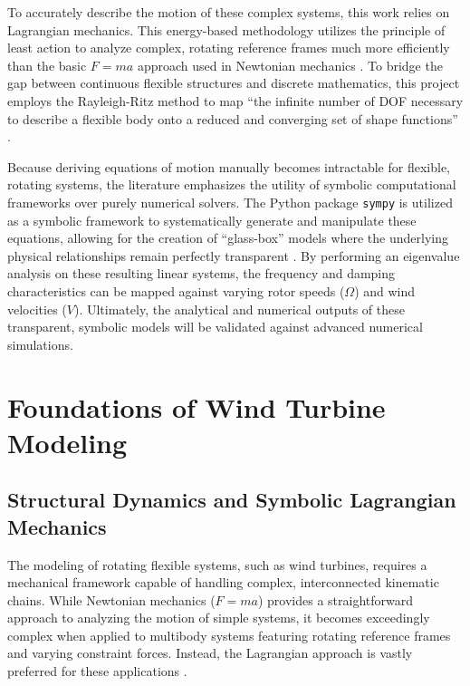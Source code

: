 \documentclass[onecolumn,draftcls]{IEEEtran}
\begin{document}
To accurately describe the motion of these complex systems, this work relies on Lagrangian mechanics. This energy-based methodology utilizes the principle of least action to analyze complex, rotating reference frames much more efficiently than the basic $F=ma$ approach used in Newtonian mechanics \cite{Branlard2025notes}. To bridge the gap between continuous flexible structures and discrete mathematics, this project employs the Rayleigh-Ritz method to map ``the infinite number of DOF necessary to describe a flexible body onto a reduced and converging set of shape functions'' \cite{branlard2019flexible}.

Because deriving equations of motion manually becomes intractable for flexible, rotating systems, the literature emphasizes the utility of symbolic computational frameworks over purely numerical solvers. The Python package \texttt{sympy} is utilized as a symbolic framework to systematically generate and manipulate these equations, allowing for the creation of ``glass-box'' models where the underlying physical relationships remain perfectly transparent \cite{branlard2022symbolic}. By performing an eigenvalue analysis on these resulting linear systems, the frequency and damping characteristics can be mapped against varying rotor speeds ($\Omega$) and wind velocities ($V$). Ultimately, the analytical and numerical outputs of these transparent, symbolic models will be validated against advanced numerical simulations.

\section{Foundations of Wind Turbine Modeling}

\subsection{Structural Dynamics and Symbolic Lagrangian Mechanics}
The modeling of rotating flexible systems, such as wind turbines, requires a mechanical framework capable of handling complex, interconnected kinematic chains. While Newtonian mechanics ($F = ma$) provides a straightforward approach to analyzing the motion of simple systems, it becomes exceedingly complex when applied to multibody systems featuring rotating reference frames and varying constraint forces. Instead, the Lagrangian approach is vastly preferred for these applications \cite{Branlard2025notes}.
\end{document}
